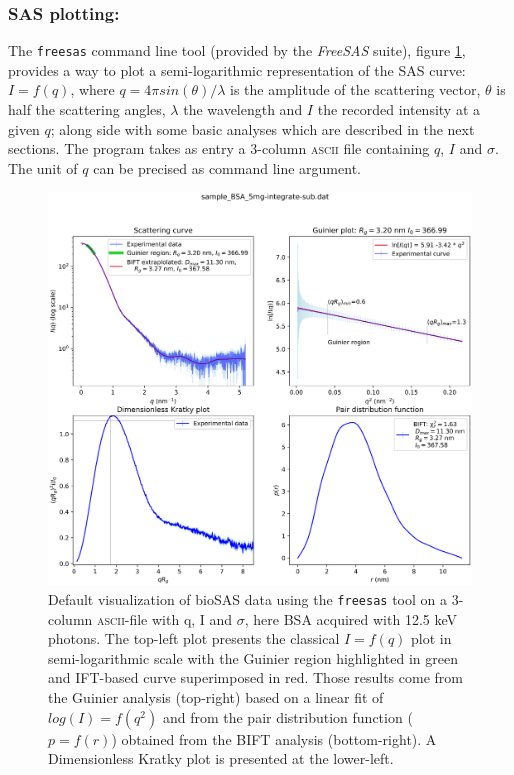 \documentclass[preprint]{iucr}              %
\begin{document}
\subsubsection{SAS plotting:} The \texttt{freesas} command line tool (provided by the \textit{FreeSAS} suite), figure \ref{plot}, provides a way to plot a semi-logarithmic representation of the SAS curve: $I=f(q)$, where $q = 4\pi sin(\theta)/\lambda$ is the amplitude of the scattering vector, $\theta$ is half the scattering angles, $\lambda$ the wavelength and $I$ the recorded intensity at a given $q$; along side with some basic analyses which are described in the next sections.
The program takes as entry a 3-column \textsc{ascii} file containing $q$, $I$ and $\sigma$. 
The unit of $q$ can be precised as command line argument.

\begin{figure}
\label{plot}
\includegraphics[width=12cm]{Figure_1.eps}
\caption{Default visualization of bioSAS data using the \texttt{freesas} tool on a 3-column \textsc{ascii}-file with q, I and $\sigma$, here BSA acquired with 12.5 keV photons. 
The top-left plot presents the classical $I=f(q)$ plot in semi-logarithmic scale with the Guinier region highlighted in green and IFT-based curve superimposed in red. Those results come from the Guinier analysis (top-right) based on a linear fit of $log(I)=f(q^2)$ and from the pair distribution function ($p=f(r)$) obtained from the BIFT analysis (bottom-right).
A Dimensionless Kratky plot is presented at the lower-left. 
}
\end{figure}
\end{document}

